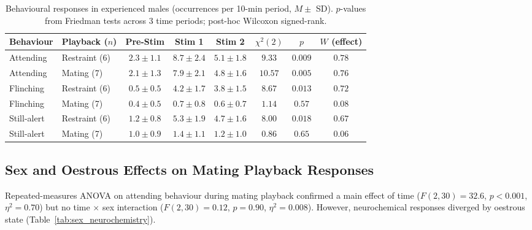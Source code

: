 \documentclass[11pt]{article}
\begin{document}
\begin{table}[H]
\centering
\caption{Behavioural responses in experienced males (occurrences per 10-min period, $M \pm$ SD). $p$-values from Friedman tests across 3 time periods; post-hoc Wilcoxon signed-rank.}
\label{tab:male_behaviour}
\begin{tabular}{llcccccc}
\toprule
Behaviour & Playback ($n$) & Pre-Stim & Stim 1 & Stim 2 & $\chi^2(2)$ & $p$ & $W$ (effect) \\
\midrule
Attending & Restraint (6) & $2.3 \pm 1.1$ & $8.7 \pm 2.4$ & $5.1 \pm 1.8$ & $9.33$ & $0.009$ & $0.78$ \\
Attending & Mating (7) & $2.1 \pm 1.3$ & $7.9 \pm 2.1$ & $4.8 \pm 1.6$ & $10.57$ & $0.005$ & $0.76$ \\
Flinching & Restraint (6) & $0.5 \pm 0.5$ & $4.2 \pm 1.7$ & $3.8 \pm 1.5$ & $8.67$ & $0.013$ & $0.72$ \\
Flinching & Mating (7) & $0.4 \pm 0.5$ & $0.7 \pm 0.8$ & $0.6 \pm 0.7$ & $1.14$ & $0.57$ & $0.08$ \\
Still-alert & Restraint (6) & $1.2 \pm 0.8$ & $5.3 \pm 1.9$ & $4.7 \pm 1.6$ & $8.00$ & $0.018$ & $0.67$ \\
Still-alert & Mating (7) & $1.0 \pm 0.9$ & $1.4 \pm 1.1$ & $1.2 \pm 1.0$ & $0.86$ & $0.65$ & $0.06$ \\
\bottomrule
\end{tabular}
\end{table}

\subsection{Sex and Oestrous Effects on Mating Playback Responses}

Repeated-measures ANOVA on attending behaviour during mating playback confirmed a main effect of time ($F(2,30) = 32.6$, $p < 0.001$, $\eta^2 = 0.70$) but no time $\times$ sex interaction ($F(2,30) = 0.12$, $p = 0.90$, $\eta^2 = 0.008$). However, neurochemical responses diverged by oestrous state (Table~\ref{tab:sex_neurochemistry}).
\end{document}
